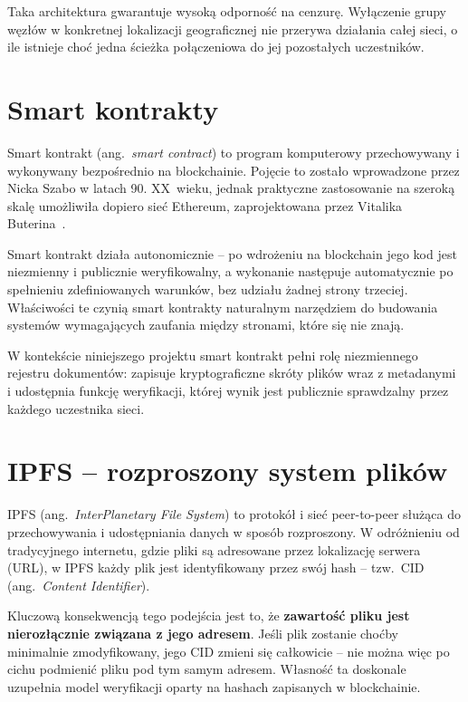 \documentclass[12pt,a4paper,twoside]{report}
\begin{document}
Taka architektura gwarantuje wysoką odporność na cenzurę. Wyłączenie grupy węzłów w
konkretnej lokalizacji geograficznej nie przerywa działania całej sieci, o ile istnieje
choć jedna ścieżka połączeniowa do jej pozostałych uczestników.

\section{Smart kontrakty}

Smart kontrakt (ang.~\textit{smart contract}) to program komputerowy przechowywany i
wykonywany bezpośrednio na blockchainie. Pojęcie to zostało wprowadzone przez Nicka Szabo
w latach 90. XX~wieku, jednak praktyczne zastosowanie na szeroką skalę umożliwiła dopiero
sieć Ethereum, zaprojektowana przez Vitalika Buterina~\cite{buterin2014ethereum}.

Smart kontrakt działa autonomicznie -- po wdrożeniu na blockchain jego kod jest niezmienny
i publicznie weryfikowalny, a wykonanie następuje automatycznie po spełnieniu zdefiniowanych
warunków, bez udziału żadnej strony trzeciej. Właściwości te czynią smart kontrakty
naturalnym narzędziem do budowania systemów wymagających zaufania między stronami, które
się nie znają.

W kontekście niniejszego projektu smart kontrakt pełni rolę niezmiennego rejestru
dokumentów: zapisuje kryptograficzne skróty plików wraz z metadanymi i udostępnia funkcję
weryfikacji, której wynik jest publicznie sprawdzalny przez każdego uczestnika sieci.

\section{IPFS -- rozproszony system plików}

IPFS (ang.~\textit{InterPlanetary File System}) to protokół i sieć peer-to-peer służąca
do przechowywania i udostępniania danych w sposób rozproszony. W odróżnieniu od
tradycyjnego internetu, gdzie pliki są adresowane przez lokalizację serwera (URL), w IPFS
każdy plik jest identyfikowany przez swój hash -- tzw.~CID
(ang.~\textit{Content Identifier}).

Kluczową konsekwencją tego podejścia jest to, że \textbf{zawartość pliku jest nierozłącznie
związana z jego adresem}. Jeśli plik zostanie choćby minimalnie zmodyfikowany, jego CID
zmieni się całkowicie -- nie można więc po cichu podmienić pliku pod tym samym adresem.
Własność ta doskonale uzupełnia model weryfikacji oparty na hashach zapisanych
w blockchainie.
\end{document}
